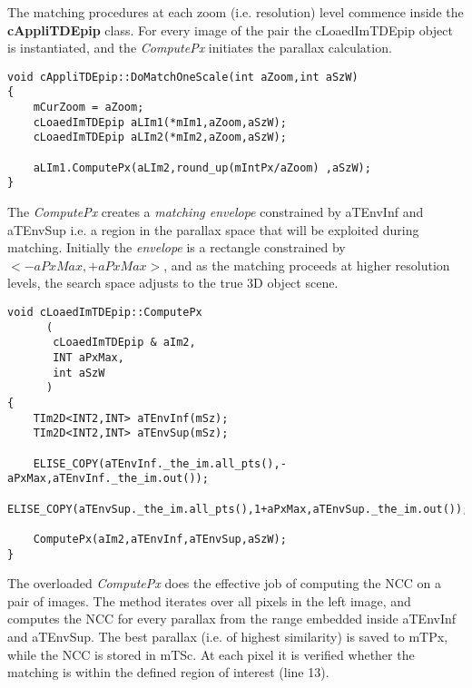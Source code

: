 The matching procedures at each zoom (i.e. resolution) level commence inside the \textbf{cAppliTDEpip} class. For every image of the pair the cLoaedImTDEpip object is instantiated, and the \emph{ComputePx} initiates the parallax calculation.

\begin{lstlisting}
void cAppliTDEpip::DoMatchOneScale(int aZoom,int aSzW)
{
	mCurZoom = aZoom;
	cLoaedImTDEpip aLIm1(*mIm1,aZoom,aSzW);
	cLoaedImTDEpip aLIm2(*mIm2,aZoom,aSzW);

	aLIm1.ComputePx(aLIm2,round_up(mIntPx/aZoom) ,aSzW);
}
\end{lstlisting}

The \emph{ComputePx} creates a \emph{matching envelope} constrained by aTEnvInf and aTEnvSup i.e. a region in the parallax space that will be exploited during matching. Initially the \emph{envelope} is a rectangle constrained by $<-aPxMax,+aPxMax>$, and as the matching proceeds at higher resolution levels, the search space adjusts to the true 3D object scene.

\begin{lstlisting}
void cLoaedImTDEpip::ComputePx
      (
	   cLoaedImTDEpip & aIm2,
	   INT aPxMax,
	   int aSzW
      )
{
	TIm2D<INT2,INT> aTEnvInf(mSz);
	TIm2D<INT2,INT> aTEnvSup(mSz);

	ELISE_COPY(aTEnvInf._the_im.all_pts(),-aPxMax,aTEnvInf._the_im.out());
	ELISE_COPY(aTEnvSup._the_im.all_pts(),1+aPxMax,aTEnvSup._the_im.out());

    ComputePx(aIm2,aTEnvInf,aTEnvSup,aSzW);
}
\end{lstlisting}

The overloaded \emph{ComputePx} does the effective job of computing the NCC on a pair of images. The method iterates over all pixels in the left image, and computes the NCC for every parallax from the range embedded inside aTEnvInf and aTEnvSup. The best parallax (i.e. of highest similarity) is saved to mTPx, while the NCC is stored in mTSc. At each pixel it is verified whether the matching is within the defined region of interest (line 13).

